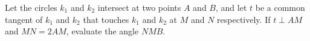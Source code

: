 Let the circles $k_1$ and $k_2$ intersect at two points $A$ and $B$, and let $t$ be a common tangent of $k_1$ and $k_2$ that touches $k_1$ and $k_2$ at $M$ and $N$ respectively. If $t\perp AM$ and $MN=2AM$, evaluate the angle $NMB$.